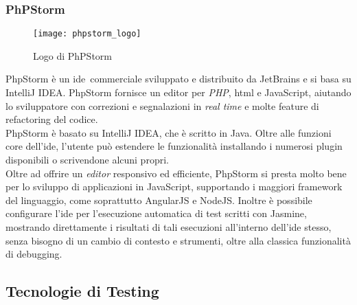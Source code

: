 \subsubsection{PhPStorm}
\begin{figure}[hb] 
    \centering 
    \texttt{[image: phpstorm\_logo]} 
    \caption{Logo di PhPStorm}
\end{figure}
PhpStorm è un \gls{ide}\glsfirstoccur\  commerciale sviluppato e distribuito da JetBrains e si basa su IntelliJ IDEA.
PhpStorm fornisce un editor per \emph{PHP}, \gls{html} e JavaScript, aiutando lo sviluppatore con correzioni e segnalazioni in \emph{real time} e molte feature di refactoring del codice.\\
PhpStorm è basato su IntelliJ IDEA, che è scritto in Java. Oltre alle funzioni core dell’\gls{ide}, l’utente può estendere le funzionalità installando i numerosi plugin disponibili o scrivendone alcuni propri.\\
Oltre ad offrire un \emph{editor} responsivo ed efficiente, PhpStorm si presta molto bene per lo sviluppo di applicazioni in JavaScript, supportando i maggiori framework del linguaggio, come soprattutto AngularJS e NodeJS. 
Inoltre è possibile configurare l’\gls{ide} per l’esecuzione automatica di test scritti con Jasmine, mostrando direttamente i risultati di tali esecuzioni all’interno dell’\gls{ide} stesso, senza bisogno di un cambio di contesto e strumenti, oltre alla classica funzionalità di debugging.

\subsection{Tecnologie di Testing}
